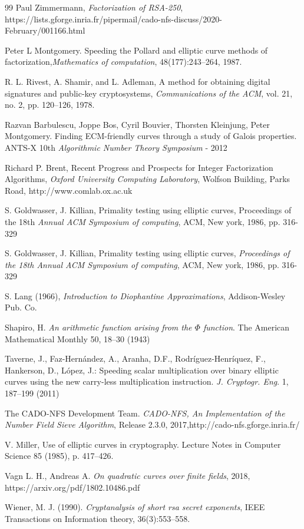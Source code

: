 \documentclass[sigconf,balance=false]{acmart}
\begin{document}
\begin{thebibliography}{99}
 Paul Zimmermann, \emph{Factorization of RSA-250}, https://lists.gforge.inria.fr/pipermail/cado-nfs-discuss/2020-February/001166.html

 Peter L Montgomery. Speeding the Pollard and elliptic curve methods of factorization,\emph{Mathematics of computation}, 48(177):243–264, 1987.




 R. L. Rivest, A. Shamir, and L. Adleman, A method for obtaining
digital signatures and public-key cryptosystems, \emph{Communications of
	the ACM}, vol. 21, no. 2, pp. 120–126, 1978.

 Razvan Barbulescu, Joppe Bos, Cyril Bouvier, Thorsten Kleinjung, Peter Montgomery. Finding ECM-friendly curves through a study of Galois properties. ANTS-X 10th \emph{Algorithmic Number Theory Symposium} - 2012

 Richard P. Brent, Recent Progress and Prospects for Integer Factorization Algorithms, \emph{Oxford University Computing Laboratory}, Wolfson Building, Parks Road, http://www.comlab.ox.ac.uk

 S. Goldwasser, J. Killian, Primality testing using elliptic curves, Proceedings of the 18th \emph{Annual ACM Symposium of computing}, ACM, New york, 1986, pp. 316-329

 S. Goldwasser, J. Killian, Primality testing using elliptic curves, \emph{Proceedings of the 18th Annual ACM Symposium of computing}, ACM, New york, 1986, pp. 316-329

 S. Lang (1966), \emph{Introduction to Diophantine Approximations}, Addison-Wesley Pub. Co.

 Shapiro, H. \emph{An arithmetic function arising from the $\Phi$ function}. The American Mathematical Monthly 50, 18–30 (1943)


 Taverne, J., Faz-Hernández, A., Aranha, D.F., Rodríguez-Henríquez, F., Hankerson, D., López, J.: Speeding scalar multiplication over binary elliptic curves using the new carry-less multiplication instruction. \emph{J. Cryptogr. Eng}. 1, 187–199 (2011)

 The CADO-NFS Development Team. \emph{CADO-NFS, An Implementation of the Number Field Sieve Algorithm}, Release 2.3.0, 2017,http://cado-nfs.gforge.inria.fr/


 V. Miller, Use of elliptic curves in cryptography. Lecture Notes in Computer Science 85 (1985), p.
417–426.

 Vagn L. H., Andreas A. \emph{On quadratic curves over finite fields}, 2018, https://arxiv.org/pdf/1802.10486.pdf

 Wiener, M. J. (1990). \emph{Cryptanalysis of short rsa secret exponents}, IEEE Transactions on Information theory, 36(3):553–558.


\end{thebibliography}
\end{document}
